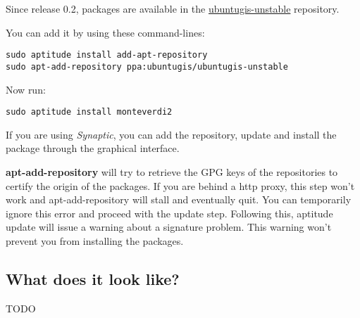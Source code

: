 Since release 0.2,  packages are available in the
\href{https://launchpad.net/~ubuntugis/+archive/ubuntugis-unstable}{ubuntugis-unstable} repository.

You can add it by using these command-lines:
\begin{verbatim}
sudo aptitude install add-apt-repository
sudo apt-add-repository ppa:ubuntugis/ubuntugis-unstable
\end{verbatim}

Now run:
\begin{verbatim}
sudo aptitude install monteverdi2
\end{verbatim}

If you are using \emph{Synaptic}, you can add the repository, update and install the package through the
graphical interface.

\textbf{apt-add-repository} will try to retrieve the GPG keys of the
repositories to certify the origin of the packages. If you are behind a http
proxy, this step won't work and apt-add-repository will stall and eventually
quit. You can temporarily ignore this error and proceed with the update
step. Following this, aptitude update will issue a warning about a signature
problem. This warning won't prevent you from installing the packages.


\subsection{What does it look like?}
TODO

